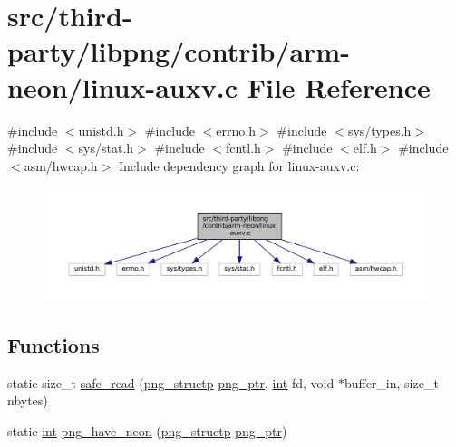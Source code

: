 \hypertarget{linux-auxv_8c}{}\section{src/third-\/party/libpng/contrib/arm-\/neon/linux-\/auxv.c File Reference}
\label{linux-auxv_8c}
{\ttfamily \#include $<$unistd.\+h$>$}\newline
{\ttfamily \#include $<$errno.\+h$>$}\newline
{\ttfamily \#include $<$sys/types.\+h$>$}\newline
{\ttfamily \#include $<$sys/stat.\+h$>$}\newline
{\ttfamily \#include $<$fcntl.\+h$>$}\newline
{\ttfamily \#include $<$elf.\+h$>$}\newline
{\ttfamily \#include $<$asm/hwcap.\+h$>$}\newline
Include dependency graph for linux-\/auxv.c\+:
\nopagebreak
\begin{figure}[H]
\begin{center}
\leavevmode
\includegraphics[width=350pt]{linux-auxv_8c__incl}
\end{center}
\end{figure}
\subsection*{Functions}
\begin{DoxyCompactItemize}
\item 
static size\+\_\+t \mbox{\hyperlink{linux-auxv_8c_a23ad580f6c3e8b4e8afd2c07d37913d2}{safe\+\_\+read}} (\mbox{\hyperlink{png_8h_a05b958915368d6bbd797ef70f24b9ff6}{png\+\_\+structp}} \mbox{\hyperlink{_png_file_8c_a55aeeb404d5f026787361dda7a4f1cb8}{png\+\_\+ptr}}, \mbox{\hyperlink{ioapi_8h_a787fa3cf048117ba7123753c1e74fcd6}{int}} fd, void $\ast$buffer\+\_\+in, size\+\_\+t nbytes)
\item 
static \mbox{\hyperlink{ioapi_8h_a787fa3cf048117ba7123753c1e74fcd6}{int}} \mbox{\hyperlink{linux-auxv_8c_a07e715fb224e41ff1a5ccbeebdb16369}{png\+\_\+have\+\_\+neon}} (\mbox{\hyperlink{png_8h_a05b958915368d6bbd797ef70f24b9ff6}{png\+\_\+structp}} \mbox{\hyperlink{_png_file_8c_a55aeeb404d5f026787361dda7a4f1cb8}{png\+\_\+ptr}})
\end{DoxyCompactItemize}


